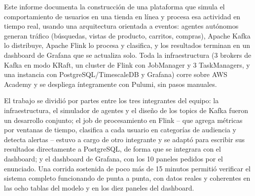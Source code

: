 \documentclass[
	spanish, %
	letterpaper, oneside
]{article}
\begin{document}
\templatePortrait

\templatePagecfg

\begin{abstractd}
	Este informe documenta la construcción de una plataforma que simula el comportamiento de usuarios en una tienda en línea y procesa esa actividad en tiempo real, usando una arquitectura orientada a eventos: agentes autónomos generan tráfico (búsquedas, vistas de producto, carritos, compras), Apache Kafka lo distribuye, Apache Flink lo procesa y clasifica, y los resultados terminan en un dashboard de Grafana que se actualiza solo. Toda la infraestructura (3 brokers de Kafka en modo KRaft, un cluster de Flink con JobManager y 3 TaskManagers, y una instancia con PostgreSQL/TimescaleDB y Grafana) corre sobre AWS Academy y se despliega íntegramente con Pulumi, sin pasos manuales.

	El trabajo se dividió por partes entre los tres integrantes del equipo: la infraestructura, el simulador de agentes y el diseño de los topics de Kafka fueron un desarrollo conjunto; el job de procesamiento en Flink -- que agrega métricas por ventanas de tiempo, clasifica a cada usuario en categorías de audiencia y detecta alertas -- estuvo a cargo de otro integrante y se adaptó para escribir sus resultados directamente a PostgreSQL, de forma que se integrara con el dashboard; y el dashboard de Grafana, con los 10 paneles pedidos por el enunciado. Una corrida sostenida de poco más de 15 minutos permitió verificar el sistema completo funcionando de punta a punta, con datos reales y coherentes en las ocho tablas del modelo y en los diez paneles del dashboard.
\end{abstractd}

\templateIndex

\templateFinalcfg


% 


\end{document}
